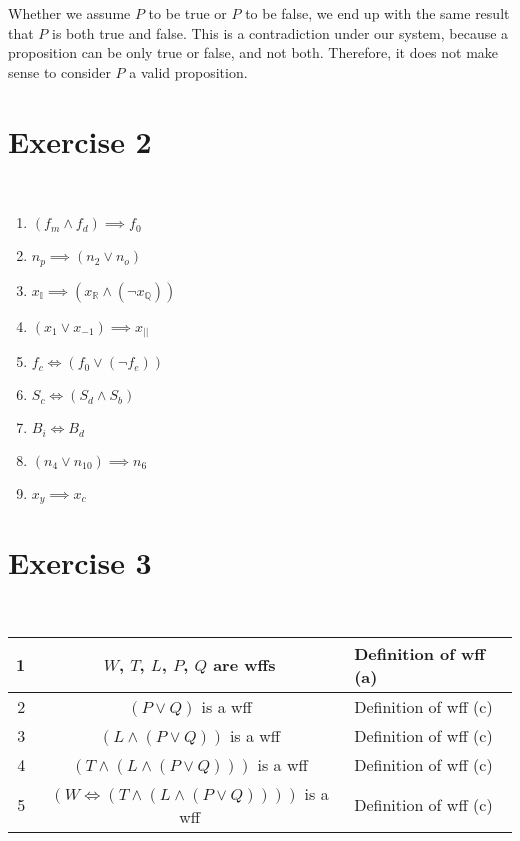 \documentclass[12pt]{article}
\begin{document}
Whether we assume $P$ to be true or $P$ to be false, we end up with the same result that $P$ is both true and false. This is a contradiction under our system, because a proposition can be only true or false, and not both. Therefore, it does not make sense to consider $P$ a valid proposition.

\newpage
\section*{Exercise 2}
\\

\begin{enumerate}
    \item $(f_m \land f_d) \implies f_0$
    \item $n_p \implies (n_2 \lor n_o)$
    \item $x_\mathbb{I} \implies (x_\mathbb{R} \land (\lnot x_\mathbb{Q}))$
    \item $(x_1 \lor x_{-1}) \implies x_{||}$
    \item $f_c \iff (f_0 \lor (\lnot f_e))$
    \item $S_c \iff (S_{d} \land S_b)$
    \item $B_i \iff B_d$
    \item $(n_4 \lor n_{10}) \implies n_6$
    \item $x_y \implies x_c$
\end{enumerate}

\section*{Exercise 3}
\\

\begin{center}
    \begin{tabular}{|r|c|l|}
        \hline
        1 & $W$, $T$, $L$, $P$, $Q$ are wffs & Definition of wff (a)\\
        \hline
        2 & $(P \lor Q)$ is a wff & Definition of wff (c)\\
        \hline
        3 & $(L \land (P \lor Q))$ is a wff & Definition of wff (c)\\
        \hline
        4 & $(T \land (L \land (P \lor Q)))$ is a wff & Definition of wff (c)\\
        \hline
        5 & $(W \iff (T \land (L \land (P \lor Q))))$ is a wff & Definition of wff (c)\\
        \hline
    \end{tabular}
\end{center}
\end{document}
